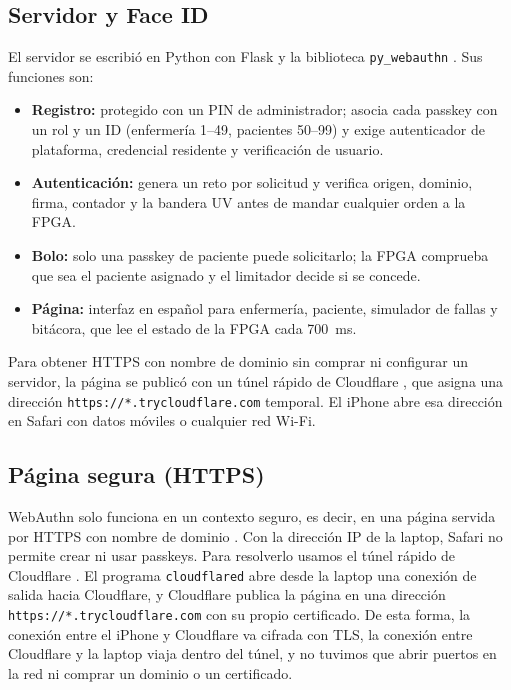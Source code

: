 \documentclass[11pt,letterpaper]{article}
\newcommand{\code}[1]{\texttt{#1}}
\begin{document}
\subsection{Servidor y Face ID}\label{sec:servidor}
El servidor se escribió en Python con Flask \cite{flask} y la biblioteca \code{py\_webauthn} \cite{pywebauthn}. Sus funciones son:
\begin{itemize}
\item \textbf{Registro:} protegido con un PIN de administrador; asocia cada passkey con un rol y un ID (enfermería 1--49, pacientes 50--99) y exige autenticador de plataforma, credencial residente y verificación de usuario.
\item \textbf{Autenticación:} genera un reto por solicitud y verifica origen, dominio, firma, contador y la bandera UV antes de mandar cualquier orden a la FPGA.
\item \textbf{Bolo:} solo una passkey de paciente puede solicitarlo; la FPGA comprueba que sea el paciente asignado y el limitador decide si se concede.
\item \textbf{Página:} interfaz en español para enfermería, paciente, simulador de fallas y bitácora, que lee el estado de la FPGA cada 700~ms.
\end{itemize}

Para obtener HTTPS con nombre de dominio sin comprar ni configurar un servidor, la página se publicó con un túnel rápido de Cloudflare \cite{cloudflare}, que asigna una dirección \code{https://*.trycloudflare.com} temporal. El iPhone abre esa dirección en Safari con datos móviles o cualquier red Wi-Fi.

\subsection{Página segura (HTTPS)}\label{sec:https}
WebAuthn solo funciona en un contexto seguro, es decir, en una página servida por HTTPS con nombre de dominio \cite{webauthn}. Con la dirección IP de la laptop, Safari no permite crear ni usar passkeys. Para resolverlo usamos el túnel rápido de Cloudflare \cite{cloudflare}. El programa \code{cloudflared} abre desde la laptop una conexión de salida hacia Cloudflare, y Cloudflare publica la página en una dirección \code{https://*.trycloudflare.com} con su propio certificado. De esta forma, la conexión entre el iPhone y Cloudflare va cifrada con TLS, la conexión entre Cloudflare y la laptop viaja dentro del túnel, y no tuvimos que abrir puertos en la red ni comprar un dominio o un certificado.
\end{document}

